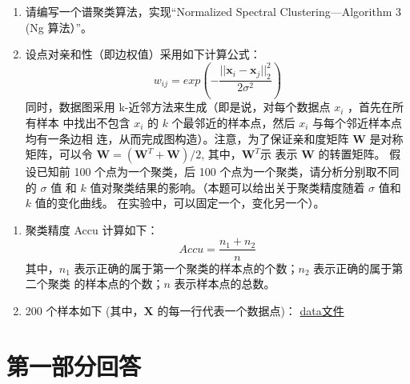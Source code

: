 \documentclass[a4paper,11pt,onecolumn,oneside,UTF8]{article}
\begin{document}
\begin{enumerate}
            \begin{enumerate}[(1). ]
                  \item 请编写一个谱聚类算法，实现“Normalized Spectral Clustering—Algorithm 3 (Ng 算法）”。
                  \item 设点对亲和性（即边权值）采用如下计算公式：
                        $$
                              w_{ij}=exp\left(-\frac{||\bm x_i-\bm x_j||_2^2}{2\sigma^2}\right)
                        $$
                        同时，数据图采用 k-近邻方法来生成（即是说，对每个数据点 $x_i$ ，首先在所有样本
                        中找出不包含 $x_i$ 的 $k$ 个最邻近的样本点，然后 $x_i$ 与每个邻近样本点均有一条边相
                        连，从而完成图构造）。注意，为了保证亲和度矩阵 $\bm W$  是对称矩阵，可以令
                        $\bm W=(\bm W^T+\bm W)/2$, 其中，$\bm W^T$示 表示 $\bm W$ 的转置矩阵。
                        假设已知前 100 个点为一个聚类，后 100 个点为一个聚类，请分析分别取不同的 $\sigma$ 值
                        和 $k$ 值对聚类结果的影响。（本题可以给出关于聚类精度随着 $\sigma$ 值和 $k$ 值的变化曲线。
                        在实验中，可以固定一个，变化另一个）。
            \end{enumerate}

\end{enumerate}

\begin{enumerate}[附注1：]
      \item  聚类精度 Accu 计算如下：
            $$
                  Accu=\frac{n_1+n_2}{n}
            $$
            其中，$n_1$ 表示正确的属于第一个聚类的样本点的个数；$n_2$ 表示正确的属于第二个聚类
            的样本点的个数；$n$ 表示样本点的总数。
      \item 200 个样本如下 (其中，$\bm X$ 的每一行代表一个数据点)：
            \href{https://github.com/Allenem/PatternRecognition/blob/main/hw5/data.txt}{data文件}
\end{enumerate}


\section*{第一部分回答}
\end{document}
